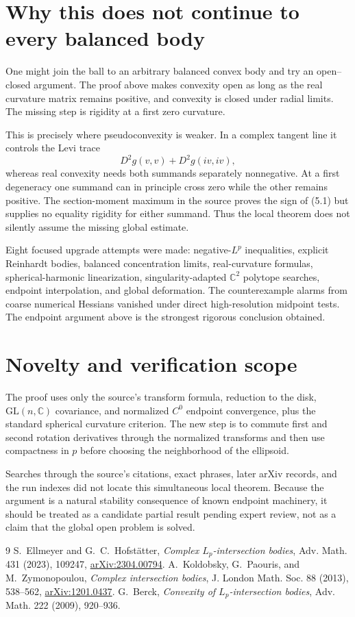 \documentclass[11pt]{article}
\newcommand{\C}{\mathbb C}
\newcommand{\GL}{\mathrm{GL}}
\begin{document}
\section{Why this does not continue to every balanced body}

One might join the ball to an arbitrary balanced convex body and try an
open--closed argument.  The proof above makes convexity open as long as the
real curvature matrix remains positive, and convexity is closed under radial
limits.  The missing step is rigidity at a first zero curvature.

This is precisely where pseudoconvexity is weaker.  In a complex tangent line
it controls the Levi trace
\[
 D^2g(v,v)+D^2g(iv,iv),                                             \tag{5.1}
\]
whereas real convexity needs both summands separately nonnegative.  At a first
degeneracy one summand can in principle cross zero while the other remains
positive.  The section-moment maximum in the source proves the sign of (5.1)
but supplies no equality rigidity for either summand.  Thus the local theorem
does not silently assume the missing global estimate.

Eight focused upgrade attempts were made: negative-$L^p$ inequalities,
explicit Reinhardt bodies, balanced concentration limits, real-curvature
formulas, spherical-harmonic linearization, singularity-adapted $\C^2$
polytope searches, endpoint interpolation, and global deformation.  The
counterexample alarms from coarse numerical Hessians vanished under direct
high-resolution midpoint tests.  The endpoint argument above is the strongest
rigorous conclusion obtained.

\section{Novelty and verification scope}

The proof uses only the source's transform formula, reduction to the disk,
$\GL(n,\C)$ covariance, and normalized $C^0$ endpoint convergence, plus the
standard spherical curvature criterion.  The new step is to commute first and
second rotation derivatives through the normalized transforms and then use
compactness in $p$ before choosing the neighborhood of the ellipsoid.

Searches through the source's citations, exact phrases, later arXiv records,
and the run indexes did not locate this simultaneous local theorem.  Because
the argument is a natural stability consequence of known endpoint machinery,
it should be treated as a candidate partial result pending expert review, not
as a claim that the global open problem is solved.

\begin{thebibliography}{9}
 S.~Ellmeyer and G.~C.~Hofst\"atter,
\emph{Complex $L_p$-intersection bodies}, Adv. Math. 431 (2023), 109247,
\href{https://arxiv.org/abs/2304.00794}{arXiv:2304.00794}.
 A.~Koldobsky, G.~Paouris, and M.~Zymonopoulou,
\emph{Complex intersection bodies}, J. London Math. Soc. 88 (2013), 538--562,
\href{https://arxiv.org/abs/1201.0437}{arXiv:1201.0437}.
 G.~Berck,
\emph{Convexity of $L_p$-intersection bodies}, Adv. Math. 222 (2009), 920--936.
\end{thebibliography}
\end{document}
